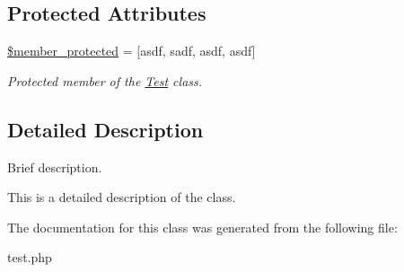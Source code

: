 \subsection*{Protected Attributes}
\begin{DoxyCompactItemize}
\item 
\hypertarget{class_test_aebac60379e54f5cd332b8bdcd4736412}{}\hyperlink{class_test_aebac60379e54f5cd332b8bdcd4736412}{\$member\+\_\+protected} = \mbox{[}\textquotesingle{}asdf\textquotesingle{}, \textquotesingle{}sadf\textquotesingle{}, \textquotesingle{}asdf\textquotesingle{}, \textquotesingle{}asdf\textquotesingle{}\mbox{]}\label{class_test_aebac60379e54f5cd332b8bdcd4736412}

\begin{DoxyCompactList}\small\item\em Protected member of the \hyperlink{class_test}{Test} class. \end{DoxyCompactList}\end{DoxyCompactItemize}


\subsection{Detailed Description}
Brief description. 

This is a detailed description of the class. 

The documentation for this class was generated from the following file\+:\begin{DoxyCompactItemize}
\item 
test.\+php\end{DoxyCompactItemize}
